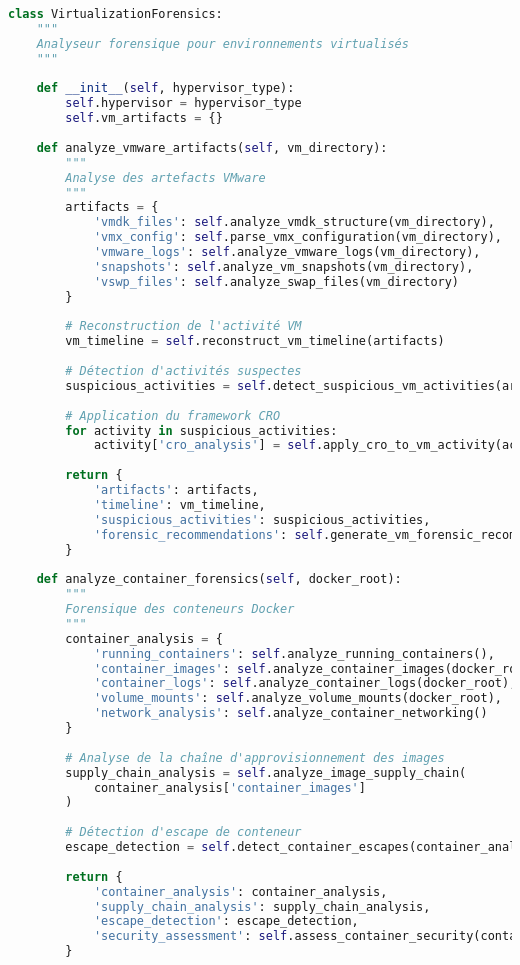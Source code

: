 \begin{lstlisting}[language=Python, caption=Analyseur de machines virtuelles]
class VirtualizationForensics:
    """
    Analyseur forensique pour environnements virtualisés
    """
    
    def __init__(self, hypervisor_type):
        self.hypervisor = hypervisor_type
        self.vm_artifacts = {}
        
    def analyze_vmware_artifacts(self, vm_directory):
        """
        Analyse des artefacts VMware
        """
        artifacts = {
            'vmdk_files': self.analyze_vmdk_structure(vm_directory),
            'vmx_config': self.parse_vmx_configuration(vm_directory),
            'vmware_logs': self.analyze_vmware_logs(vm_directory),
            'snapshots': self.analyze_vm_snapshots(vm_directory),
            'vswp_files': self.analyze_swap_files(vm_directory)
        }
        
        # Reconstruction de l'activité VM
        vm_timeline = self.reconstruct_vm_timeline(artifacts)
        
        # Détection d'activités suspectes
        suspicious_activities = self.detect_suspicious_vm_activities(artifacts)
        
        # Application du framework CRO
        for activity in suspicious_activities:
            activity['cro_analysis'] = self.apply_cro_to_vm_activity(activity)
            
        return {
            'artifacts': artifacts,
            'timeline': vm_timeline,
            'suspicious_activities': suspicious_activities,
            'forensic_recommendations': self.generate_vm_forensic_recommendations(artifacts)
        }
    
    def analyze_container_forensics(self, docker_root):
        """
        Forensique des conteneurs Docker
        """
        container_analysis = {
            'running_containers': self.analyze_running_containers(),
            'container_images': self.analyze_container_images(docker_root),
            'container_logs': self.analyze_container_logs(docker_root),
            'volume_mounts': self.analyze_volume_mounts(docker_root),
            'network_analysis': self.analyze_container_networking()
        }
        
        # Analyse de la chaîne d'approvisionnement des images
        supply_chain_analysis = self.analyze_image_supply_chain(
            container_analysis['container_images']
        )
        
        # Détection d'escape de conteneur
        escape_detection = self.detect_container_escapes(container_analysis)
        
        return {
            'container_analysis': container_analysis,
            'supply_chain_analysis': supply_chain_analysis,
            'escape_detection': escape_detection,
            'security_assessment': self.assess_container_security(container_analysis)
        }
\end{lstlisting}

